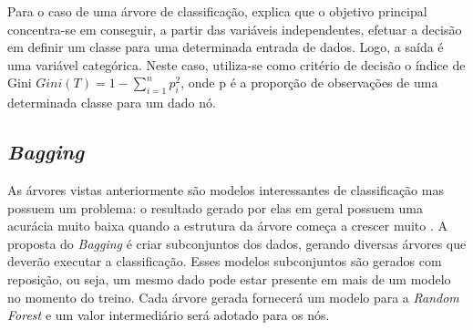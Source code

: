 Para o caso de uma árvore de classificação,  explica que o objetivo principal concentra-se em conseguir, a partir das variáveis independentes, efetuar a decisão em definir um classe para uma determinada entrada de dados. Logo, a saída é uma variável categórica.
Neste caso, utiliza-se como critério de decisão o índice de Gini\footnotemark {}
\begin{math}Gini(T) = 1 - \sum_{i=1}^{n}{ p_{i}^{2}}\end{math},
onde p é a proporção de observações de uma determinada classe para um dado nó.

\subsection{\emph{Bagging}}

As árvores vistas anteriormente são modelos interessantes de classificação mas possuem um problema: o resultado gerado por elas em geral possuem uma acurácia muito baixa quando a estrutura da árvore começa a crescer muito \cite[p. 312]{HASTIE}.
A proposta do \emph{Bagging} é criar subconjuntos dos dados, gerando diversas árvores que deverão executar a classificação. Esses modelos subconjuntos são gerados com reposição, ou seja, um mesmo dado pode estar presente em mais de um modelo no momento do treino. Cada árvore gerada fornecerá um modelo para a \emph{Random Forest} e um valor intermediário será adotado para os nós. 


